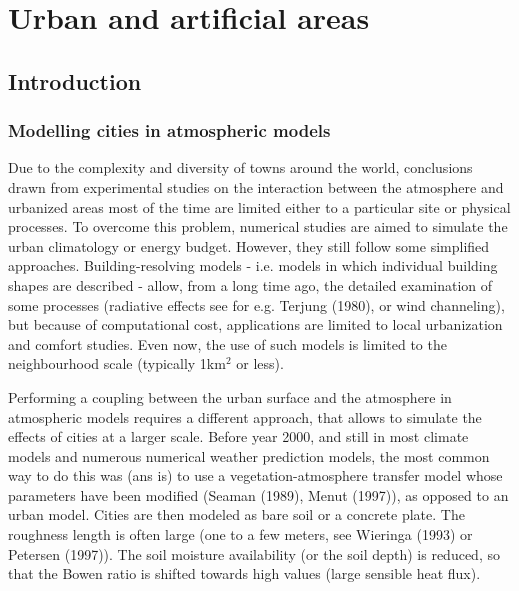 
\chapter{Urban and artificial areas}
\minitoc


\section{Introduction}

\subsection{Modelling cities in atmospheric models}

Due to the complexity and diversity of towns around the world,
conclusions drawn from experimental studies on the interaction between the
atmosphere and urbanized areas
most of the time are limited either to a particular site
or physical processes. To overcome this problem,
numerical studies are aimed to simulate the urban climatology or energy budget.
However, they still follow some simplified approaches.
Building-resolving models - i.e. models in which individual building
shapes are described - allow, from a long time ago, the detailed examination of some processes
(radiative effects see for e.g. Terjung \etal (1980)\nocite{terjung1980}, 
or wind channeling), but because of
computational cost, applications are limited to local urbanization and comfort studies. Even now, the use of such models is limited to the neighbourhood scale (typically 1km$^2$ or less).

Performing a coupling between the urban surface and the atmosphere in atmospheric models requires a different approach, that allows to simulate the effects of cities at a larger scale. Before year 2000, and still in most climate models and numerous numerical weather 
prediction models, the most common way to do this was (ans is) to use a vegetation-atmosphere transfer model whose parameters have been modified (Seaman \etal (1989)\nocite{seaman1989}, Menut (1997)\nocite{menut1997}), as opposed to an urban model.
Cities are then modeled as bare soil or a concrete plate. The roughness length is often large (one to a few meters, see Wieringa (1993)\nocite{wieringa1993} or Petersen (1997)\nocite{petersen1997}). The soil moisture availability (or the soil depth) is reduced, so that the Bowen ratio is shifted towards high values (large sensible heat flux).

